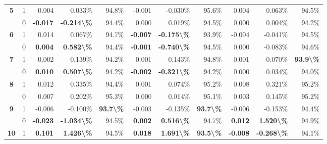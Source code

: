 \begin{table}
\begin{tabular}[t]{>{}ccrrrrrrrrr}
\multirow[t]{-2}{*}{\centering\arraybackslash \textbf{5}} & 1 & 0.004 & 0.033\% & 94.8\% & -0.001 & -0.030\% & 95.6\% & 0.004 & 0.063\% & 94.5\%\\

 & 0 & \textbf{-0.017} & \textbf{-0.214\textbackslash{}\%} & 94.4\% & 0.000 & 0.019\% & 94.5\% & 0.000 & 0.004\% & 94.2\%\\

\multirow[t]{-2}{*}{\centering\arraybackslash \textbf{6}} & 1 & 0.014 & 0.067\% & 94.7\% & \textbf{-0.007} & \textbf{-0.175\textbackslash{}\%} & 93.9\% & -0.004 & -0.041\% & 94.5\%\\

\rule{0pt}{4ex}
 & 0 & \textbf{ 0.004} & \textbf{ 0.582\textbackslash{}\%} & 94.4\% & \textbf{-0.001} & \textbf{-0.740\textbackslash{}\%} & 94.5\% & 0.000 & -0.083\% & 94.6\%\\

\multirow[t]{-2}{*}{\centering\arraybackslash \textbf{7}} & 1 & 0.002 & 0.139\% & 94.2\% & 0.001 & 0.143\% & 94.8\% & 0.001 & 0.070\% & \textbf{93.9\textbackslash{}\%}\\

 & 0 & \textbf{ 0.010} & \textbf{ 0.507\textbackslash{}\%} & 94.2\% & \textbf{-0.002} & \textbf{-0.321\textbackslash{}\%} & 94.2\% & 0.000 & 0.034\% & 94.0\%\\

\multirow[t]{-2}{*}{\centering\arraybackslash \textbf{8}} & 1 & 0.012 & 0.335\% & 94.4\% & 0.001 & 0.074\% & 95.2\% & 0.008 & 0.321\% & 95.2\%\\

 & 0 & 0.007 & 0.202\% & 95.3\% & 0.000 & 0.014\% & 95.1\% & 0.003 & 0.145\% & 95.2\%\\

\multirow[t]{-2}{*}{\centering\arraybackslash \textbf{9}} & 1 & -0.006 & -0.100\% & \textbf{93.7\textbackslash{}\%} & -0.003 & -0.135\% & \textbf{93.7\textbackslash{}\%} & -0.006 & -0.153\% & 94.4\%\\

\rule{0pt}{4ex}
 & 0 & \textbf{-0.023} & \textbf{-1.034\textbackslash{}\%} & 94.5\% & \textbf{ 0.002} & \textbf{ 0.516\textbackslash{}\%} & 94.7\% & \textbf{ 0.012} & \textbf{ 1.520\textbackslash{}\%} & 94.9\%\\

\multirow[t]{-2}{*}{\centering\arraybackslash \textbf{10}} & 1 & \textbf{ 0.101} & \textbf{ 1.426\textbackslash{}\%} & 94.5\% & \textbf{ 0.018} & \textbf{ 1.691\textbackslash{}\%} & \textbf{93.5\textbackslash{}\%} & \textbf{-0.008} & \textbf{-0.268\textbackslash{}\%} & 94.1\%\\
\bottomrule
\end{tabular}
\end{table}

